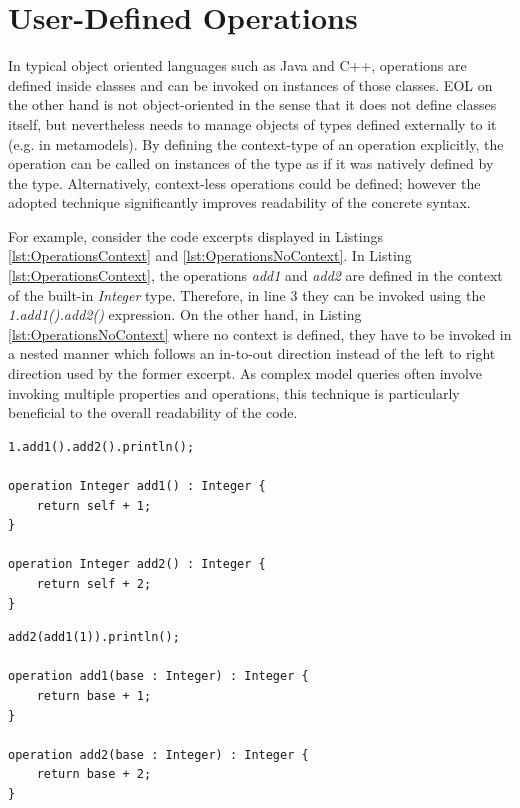 \section{User-Defined Operations}
\label{sec:Design.EOL.Operations}

In typical object oriented languages such as Java and C++, operations are defined inside classes and can be invoked on instances of those classes. EOL on the other hand is not object-oriented in the sense that it does not define classes itself, but nevertheless needs to manage objects of types defined externally to it (e.g. in metamodels). By defining the context-type of an operation explicitly, the operation can be called on instances of the type as if it was natively defined by the type. Alternatively, context-less operations could be defined; however the adopted technique significantly improves readability of the concrete syntax.

For example, consider the code excerpts displayed in Listings \ref{lst:OperationsContext} and \ref{lst:OperationsNoContext}. In Listing \ref{lst:OperationsContext}, the operations \emph{add1} and \emph{add2} are defined in the context of the built-in \emph{Integer} type. Therefore, in line 3 they can be invoked using the \emph{1.add1().add2()} expression. On the other hand, in Listing \ref{lst:OperationsNoContext} where no context is defined, they have to be invoked in a nested manner which follows an in-to-out direction instead of the left to right direction used by the former excerpt. As complex model queries often involve invoking multiple properties and operations, this technique is particularly beneficial to the overall readability of the code.

\begin{lstlisting}[basicstyle=\ttfamily\footnotesize, flexiblecolumns=true, numbers=none, nolol=true, caption=Exemplar context-defining EOL operations, label=lst:OperationsContext, numbers=left, language=EOL, tabsize=2]
1.add1().add2().println();

operation Integer add1() : Integer {
	return self + 1;
}

operation Integer add2() : Integer {
	return self + 2;
}
\end{lstlisting}

\begin{lstlisting}[basicstyle=\ttfamily\footnotesize, flexiblecolumns=true, numbers=none, nolol=true, caption=Exemplar EOL context-less EOL operations, label=lst:OperationsNoContext, numbers=left, language=EOL, tabsize=2]
add2(add1(1)).println();

operation add1(base : Integer) : Integer {
	return base + 1;
}

operation add2(base : Integer) : Integer {
	return base + 2;
}
\end{lstlisting}

